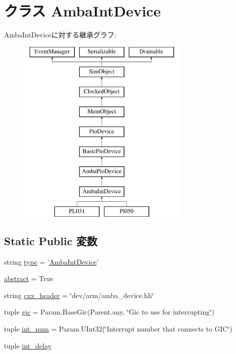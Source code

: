 \hypertarget{classRealView_1_1AmbaIntDevice}{
\section{クラス AmbaIntDevice}
\label{classRealView_1_1AmbaIntDevice}
}
AmbaIntDeviceに対する継承グラフ:\begin{figure}[H]
\begin{center}
\leavevmode
\includegraphics[height=9cm]{classRealView_1_1AmbaIntDevice}
\end{center}
\end{figure}
\subsection*{Static Public 変数}
\begin{DoxyCompactItemize}
\item 
string \hyperlink{classRealView_1_1AmbaIntDevice_acce15679d830831b0bbe8ebc2a60b2ca}{type} = '\hyperlink{classRealView_1_1AmbaIntDevice}{AmbaIntDevice}'
\item 
\hyperlink{classRealView_1_1AmbaIntDevice_a17fa61ac3806b481cafee5593b55e5d0}{abstract} = True
\item 
string \hyperlink{classRealView_1_1AmbaIntDevice_a17da7064bc5c518791f0c891eff05fda}{cxx\_\-header} = \char`\"{}dev/arm/amba\_\-device.hh\char`\"{}
\item 
tuple \hyperlink{classRealView_1_1AmbaIntDevice_a40243beb62d217c3a9e35801ae739fd0}{gic} = Param.BaseGic(Parent.any, \char`\"{}Gic to use for interrupting\char`\"{})
\item 
tuple \hyperlink{classRealView_1_1AmbaIntDevice_a65fded6db751c1b9aa7168b29056e819}{int\_\-num} = Param.UInt32(\char`\"{}Interrupt number that connects to GIC\char`\"{})
\item 
tuple \hyperlink{classRealView_1_1AmbaIntDevice_a849551e71f91ca939d22d4c083f4c731}{int\_\-delay}
\end{DoxyCompactItemize}


